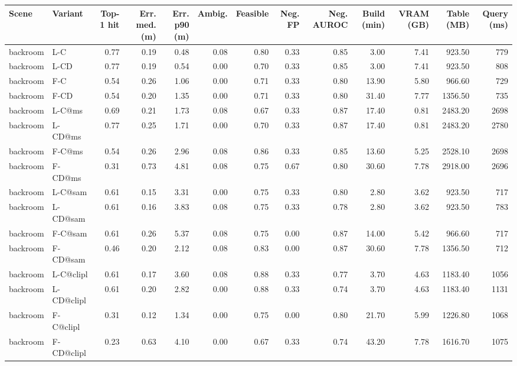 \begin{table}[ht]
\centering\small
\begin{tabular}{@{}llrrrrrrrrrrr@{}}
\toprule
Scene & Variant & Top-1 hit & Err. med. (m) & Err. p90 (m) & Ambig. & Feasible & Neg. FP & Neg. AUROC & Build (min) & VRAM (GB) & Table (MB) & Query (ms) \\
\midrule
backroom & L-C & 0.77 & 0.19 & 0.48 & 0.08 & 0.80 & 0.33 & 0.85 & 3.00 & 7.41 & 923.50 & 779 \\
backroom & L-CD & 0.77 & 0.19 & 0.54 & 0.00 & 0.70 & 0.33 & 0.85 & 3.00 & 7.41 & 923.50 & 808 \\
backroom & F-C & 0.54 & 0.26 & 1.06 & 0.00 & 0.71 & 0.33 & 0.80 & 13.90 & 5.80 & 966.60 & 729 \\
backroom & F-CD & 0.54 & 0.20 & 1.35 & 0.00 & 0.71 & 0.33 & 0.80 & 31.40 & 7.77 & 1356.50 & 735 \\
backroom & L-C@ms & 0.69 & 0.21 & 1.73 & 0.08 & 0.67 & 0.33 & 0.87 & 17.40 & 0.81 & 2483.20 & 2698 \\
backroom & L-CD@ms & 0.77 & 0.25 & 1.71 & 0.00 & 0.70 & 0.33 & 0.87 & 17.40 & 0.81 & 2483.20 & 2780 \\
backroom & F-C@ms & 0.54 & 0.26 & 2.96 & 0.08 & 0.86 & 0.33 & 0.85 & 13.60 & 5.25 & 2528.10 & 2698 \\
backroom & F-CD@ms & 0.31 & 0.73 & 4.81 & 0.08 & 0.75 & 0.67 & 0.80 & 30.60 & 7.78 & 2918.00 & 2696 \\
backroom & L-C@sam & 0.61 & 0.15 & 3.31 & 0.00 & 0.75 & 0.33 & 0.80 & 2.80 & 3.62 & 923.50 & 717 \\
backroom & L-CD@sam & 0.61 & 0.16 & 3.83 & 0.08 & 0.75 & 0.33 & 0.78 & 2.80 & 3.62 & 923.50 & 783 \\
backroom & F-C@sam & 0.61 & 0.26 & 5.37 & 0.08 & 0.75 & 0.00 & 0.87 & 14.00 & 5.42 & 966.60 & 717 \\
backroom & F-CD@sam & 0.46 & 0.20 & 2.12 & 0.08 & 0.83 & 0.00 & 0.87 & 30.60 & 7.78 & 1356.50 & 712 \\
backroom & L-C@clipl & 0.61 & 0.17 & 3.60 & 0.08 & 0.88 & 0.33 & 0.77 & 3.70 & 4.63 & 1183.40 & 1056 \\
backroom & L-CD@clipl & 0.61 & 0.20 & 2.82 & 0.00 & 0.88 & 0.33 & 0.74 & 3.70 & 4.63 & 1183.40 & 1131 \\
backroom & F-C@clipl & 0.31 & 0.12 & 1.34 & 0.00 & 0.75 & 0.00 & 0.80 & 21.70 & 5.99 & 1226.80 & 1068 \\
backroom & F-CD@clipl & 0.23 & 0.63 & 4.10 & 0.00 & 0.67 & 0.33 & 0.74 & 43.20 & 7.78 & 1616.70 & 1075 \\

\end{tabular}
\end{table}

